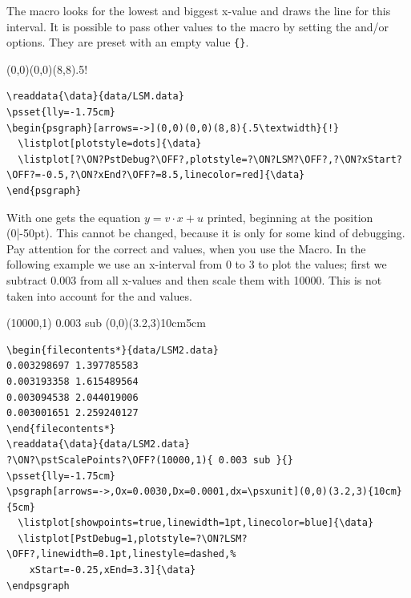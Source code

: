 \documentclass[11pt,english,BCOR=10mm,DIV=12,bibliography=totoc,parskip=false,headings=small,
    headinclude=false,footinclude=false,twoside]{pst-doc}
\begin{document}
The macro looks for the lowest and biggest x-value and draws the
line for this interval. It is possible to pass other values to the
macro by setting the  and/or  options.
They are preset with an empty value \verb+{}+.

\bgroup
\centering
{}
\begin{psgraph}[arrows=->](0,0)(0,0)(8,8){.5\textwidth}{!}
  \listplot[plotstyle=dots]{\data}
  \listplot[PstDebug=1,plotstyle=LSM,xStart=-0.5,xEnd=8.5,linecolor=red]{\data}
\end{psgraph}
\egroup

\begin{lstlisting}
\readdata{\data}{data/LSM.data}
\psset{lly=-1.75cm}
\begin{psgraph}[arrows=->](0,0)(0,0)(8,8){.5\textwidth}{!}
  \listplot[plotstyle=dots]{\data}
  \listplot[?\ON?PstDebug?\OFF?,plotstyle=?\ON?LSM?\OFF?,?\ON?xStart?\OFF?=-0.5,?\ON?xEnd?\OFF?=8.5,linecolor=red]{\data}
\end{psgraph}
\end{lstlisting}


With  one gets the equation $y=v\cdot x+u$
printed, beginning at the position (0|-50pt). This cannot be
changed, because it is only for some kind of debugging. Pay
attention for the correct  and  values,
when you use the  Macro. In the following
example we use an x-interval from 0 to 3 to plot the values; first
we subtract 0.003 from all x-values and then scale them with
10000. This is not taken into account for the  and
 values.


\bgroup
\centering
{}
\pstScalePoints(10000,1){ 0.003 sub }{}
\psgraph[arrows=->,Ox=0.0030,Dx=0.0001,dx=\psxunit](0,0)(3.2,3){10cm}{5cm}
  \listplot[showpoints=true,linewidth=1pt,linecolor=blue]{\data}
  \listplot[PstDebug=1,plotstyle=LSM,linewidth=0.1pt,linestyle=dashed,%
    xStart=-0.25,xEnd=3.3]{\data}
\endpsgraph
\egroup

\begin{lstlisting}
\begin{filecontents*}{data/LSM2.data}
0.003298697 1.397785583
0.003193358 1.615489564
0.003094538 2.044019006
0.003001651 2.259240127
\end{filecontents*}
\readdata{\data}{data/LSM2.data}
?\ON?\pstScalePoints?\OFF?(10000,1){ 0.003 sub }{}
\psset{lly=-1.75cm}
\psgraph[arrows=->,Ox=0.0030,Dx=0.0001,dx=\psxunit](0,0)(3.2,3){10cm}{5cm}
  \listplot[showpoints=true,linewidth=1pt,linecolor=blue]{\data}
  \listplot[PstDebug=1,plotstyle=?\ON?LSM?\OFF?,linewidth=0.1pt,linestyle=dashed,%
    xStart=-0.25,xEnd=3.3]{\data}
\endpsgraph
\end{lstlisting}
\end{document}
